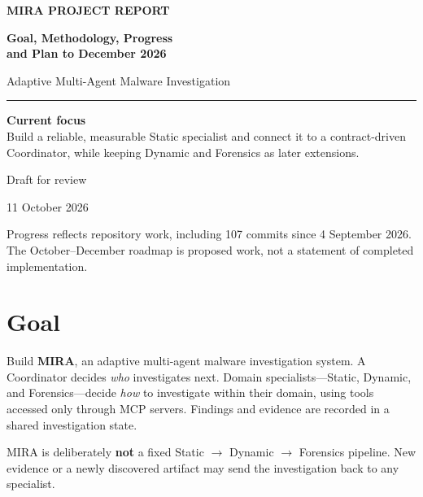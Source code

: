 \documentclass[11pt,a4paper]{article}
\begin{document}
\begin{titlepage}
  \centering
  \vspace*{1.1cm}
  {\Large\bfseries\textcolor{mirateal}{MIRA PROJECT REPORT}\par}
  \vspace{0.5cm}
  {\Huge\bfseries\textcolor{mirablue}{Goal, Methodology, Progress\\[0.15em] and Plan to December 2026}\par}
  \vspace{0.8cm}
  {\large Adaptive Multi-Agent Malware Investigation\par}
  \vspace{1.5cm}
  \color{mirateal}\rule{0.72\textwidth}{1.2pt}
  \vspace{1.2cm}

  \begin{minipage}{0.82\textwidth}
    \large
    \textbf{Current focus}\\[0.25em]
    Build a reliable, measurable Static specialist and connect it to a contract-driven Coordinator, while keeping Dynamic and Forensics as later extensions.
  \end{minipage}

  \vfill
  {\large Draft for review\par}
  \vspace{0.25cm}
  {\normalsize 11 October 2026\par}
  \vspace{0.2cm}
  {\small\textcolor{muted}{Progress reflects repository work, including 107 commits since 4 September 2026. The October--December roadmap is proposed work, not a statement of completed implementation.}\par}
\end{titlepage}

\tableofcontents
\newpage

\section{Goal}

Build \textbf{MIRA}, an adaptive multi-agent malware investigation system. A Coordinator decides \emph{who} investigates next. Domain specialists---Static, Dynamic, and Forensics---decide \emph{how} to investigate within their domain, using tools accessed only through MCP servers. Findings and evidence are recorded in a shared investigation state.

MIRA is deliberately \textbf{not} a fixed Static $\rightarrow$ Dynamic $\rightarrow$ Forensics pipeline. New evidence or a newly discovered artifact may send the investigation back to any specialist.
\end{document}
